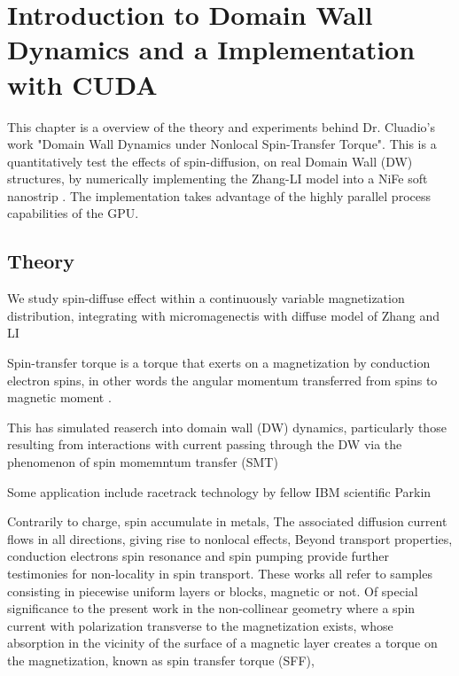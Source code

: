
\chapter{Introduction to Domain Wall Dynamics and a Implementation with CUDA} %

\label{Introduction to DW Dynamics} %


This chapter is a overview of the theory and experiments behind Dr. Cluadio's work "Domain Wall Dynamics under Nonlocal Spin-Transfer Torque". This is a quantitatively test the effects of spin-diffusion, on real Domain Wall (DW) structures, by numerically implementing the Zhang-LI model into a NiFe soft nanostrip \cite{claudio}. The implementation takes advantage of the highly parallel process capabilities of the GPU.


\section{Theory}



%

We study spin-diffuse effect within a continuously variable magnetization distribution, integrating with micromagenectis with diffuse model of Zhang and LI \cite{claudio}

Spin-transfer torque is a torque that exerts on a magnetization by conduction electron spins, in other words the angular momentum transferred from spins to magnetic  moment \cite{zhang}.

This has simulated reaserch into domain wall (DW) dynamics, particularly those resulting from interactions with current passing through the DW via the phenomenon of spin momemntum transfer (SMT) \cite{handbookspin}

Some application include racetrack technology by fellow IBM scientific Parkin \cite{racetrack}



Contrarily to charge, spin accumulate in metals, The associated diffusion current flows in all directions, giving rise to nonlocal effects, Beyond transport properties, conduction electrons spin resonance and spin pumping provide further testimonies for non-locality in spin transport. These works all refer  to samples consisting in piecewise uniform layers or blocks, magnetic or not. Of special significance to the present work in the non-collinear geometry where a spin current with polarization transverse to the magnetization exists, whose absorption in the vicinity of the surface of a magnetic layer creates a torque on the magnetization, known as spin transfer torque (SFF), 


